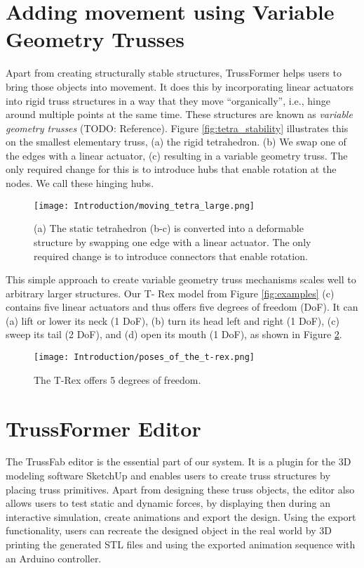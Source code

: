 \section{Adding movement using Variable Geometry Trusses}
Apart from creating structurally stable structures, TrussFormer helps users to bring those objects into movement. It does this by incorporating linear actuators into rigid truss structures in a way that they move ``organically'', i.e., hinge around multiple points at the same time. These structures are known as \textit{variable geometry trusses} (TODO: Reference).
Figure \ref{fig:tetra_stability} illustrates this on the smallest elementary truss, (a) the rigid tetrahedron. (b) We swap one of the edges with a linear actuator, (c) resulting in a variable geometry truss. The only required change for this is to introduce hubs that enable rotation at the nodes. We call these hinging hubs.
\begin{figure}[h!]
    \texttt{[image: Introduction/moving\_tetra\_large.png]}
    \centering
    \caption{(a) The static tetrahedron (b-c) is converted into a deformable structure by swapping one edge with a linear actuator. The only required change is to introduce connectors that enable rotation.}
    \label{fig:moving_tetra}
\end{figure}
This simple approach to create variable geometry truss mechanisms scales well to arbitrary larger structures. Our T- Rex model from Figure \ref{fig:examples} (c) contains five linear actuators and thus offers five degrees of freedom (DoF). It can (a) lift or lower its neck (1 DoF), (b) turn its head left and right (1 DoF), (c) sweep its tail (2 DoF), and (d) open its mouth (1 DoF), as shown in Figure \ref{fig:t-rex_poses}.
\begin{figure}[h!]
    \texttt{[image: Introduction/poses\_of\_the\_t-rex.png]}
    \centering
    \caption{The T-Rex offers 5 degrees of freedom.}
    \label{fig:t-rex_poses}
\end{figure}

\section{TrussFormer Editor}
The TrussFab editor is the essential part of our system. It is a plugin for the 3D modeling software SketchUp and enables users to create truss structures by placing truss primitives. Apart from designing these truss objects, the editor also allows users to test static and dynamic forces, by displaying then during an interactive simulation, create animations and export the design. Using the export functionality, users can recreate the designed object in the real world by 3D printing the generated STL files and using the exported animation sequence with an Arduino controller.

